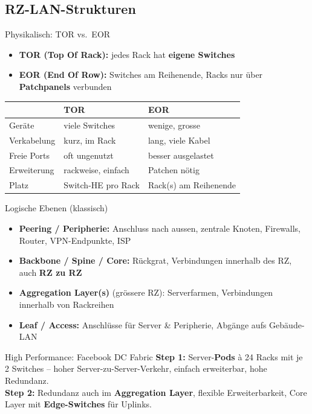 \documentclass[a4paper, fontsize=7pt]{scrartcl}
\renewcommand*{\arraystretch}{1.5}  %
\begin{document}
\subsection{RZ-LAN-Strukturen}

\begin{mainbox}{Physikalisch: TOR vs.\ EOR}
\begin{itemize}
    \item \textbf{TOR (Top Of Rack):} jedes Rack hat \textbf{eigene
          Switches}
    \item \textbf{EOR (End Of Row):} Switches am Reihenende, Racks nur über
          \textbf{Patchpanels} verbunden
\end{itemize}
\renewcommand*{\arraystretch}{1.15}
\begin{tabularx}{\linewidth}{@{}l|>{\raggedright\arraybackslash}X|>{\raggedright\arraybackslash}X@{}}
 & \textbf{TOR} & \textbf{EOR} \\
\hline
Geräte & viele Switches & wenige, grosse \\
Verkabelung & kurz, im Rack & lang, viele Kabel \\
Freie Ports & oft ungenutzt & besser ausgelastet \\
Erweiterung & rackweise, einfach & Patchen nötig \\
Platz & Switch-HE pro Rack & Rack(s) am Reihenende \\
\end{tabularx}
\end{mainbox}

\begin{mainbox}{Logische Ebenen (klassisch)}
\begin{itemize}
    \item \textbf{Peering / Peripherie:} Anschluss nach aussen, zentrale
          Knoten, Firewalls, Router, VPN-Endpunkte, ISP
    \item \textbf{Backbone / Spine / Core:} Rückgrat, Verbindungen
          innerhalb des RZ, auch \textbf{RZ zu RZ}
    \item \textbf{Aggregation Layer(s)} (grössere RZ): Serverfarmen,
          Verbindungen innerhalb von Rackreihen
    \item \textbf{Leaf / Access:} Anschlüsse für Server \& Peripherie,
          Abgänge aufs Gebäude-LAN
\end{itemize}
\end{mainbox}

\begin{subbox}{High Performance: Facebook DC Fabric}
\textbf{Step 1:} Server-\textbf{Pods} à 24 Racks mit je 2 Switches --
hoher Server-zu-Server-Verkehr, einfach erweiterbar, hohe Redundanz.\\
\textbf{Step 2:} Redundanz auch im \textbf{Aggregation Layer}, flexible
Erweiterbarkeit, Core Layer mit \textbf{Edge-Switches} für Uplinks.
\end{subbox}
\end{document}
